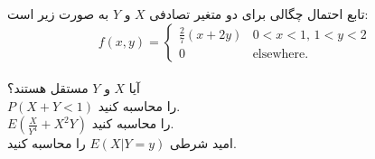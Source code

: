 \problem{}
تابع احتمال چگالی برای دو متغیر تصادفی $X$ و $Y$ به صورت زیر است:
\[
f(x, y) =
\begin{cases} 
\frac{2}{7} (x + 2y) & 0 < x < 1, \, 1 < y < 2 \\ 
0 & \text{elsewhere.}
\end{cases}
\]
\\
\subproblem{}
آیا $X$ و $Y$ مستقل هستند؟\\
\subproblem{}
$P(X + Y < 1)$ را محاسبه کنید.\\
\subproblem{}
$E(\frac{X}{Y^4} + X^2Y)$ را محاسبه کنید.\\
\subproblem{}
امید شرطی $E(X|Y=y)$ را محاسبه کنید.\\
